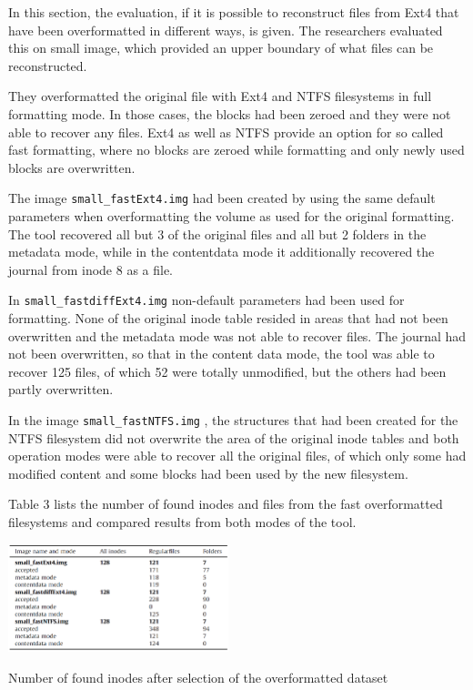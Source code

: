 \documentclass{acm_proc_article-sp}
\begin{document}
In this section, the evaluation, if it is possible to reconstruct files from Ext4 that have been overformatted in different ways, is given. The researchers evaluated this on small image, which provided an upper boundary of what files can be reconstructed.

They overformatted the original file with Ext4 and NTFS filesystems in full formatting mode. In those cases, the blocks had been zeroed and they were not able to recover any files. Ext4 as well as NTFS provide an option for so called fast formatting, where no blocks are zeroed while formatting and only newly used blocks are overwritten.

The image \texttt{small\_fastExt4.img} 
 had been created by using the same default parameters when overformatting the volume as used for the original formatting. The tool recovered all but 3 of the original files and all but 2 folders in the metadata mode, while in the contentdata mode it additionally recovered the journal from inode 8 as a file.

In \texttt{small\_fastdiffExt4.img} non-default parameters had been used 
 for formatting. None of the original inode table resided in areas that had not been overwritten and the metadata mode was not able to recover files. The journal had not been overwritten, so that in the content data mode, the tool was able to recover 125 files, of which 52 were totally unmodified, but the others had been partly overwritten.

In the image 
\texttt{small\_fastNTFS.img}
, the structures that had been created for the NTFS filesystem did not overwrite the area of the original inode tables and both operation modes were able to recover all the original files, of which only some had modified content and some blocks had been used by the new filesystem.

Table 3 lists the number of found inodes and files from the fast overformatted filesystems and compared results from both modes of the tool.

\begin{table}
\centering
\includegraphics[width=0.48\textwidth]{images/number.png}
	\caption{Number of found inodes after selection of the overformatted dataset}
\end{table}
\end{document}
